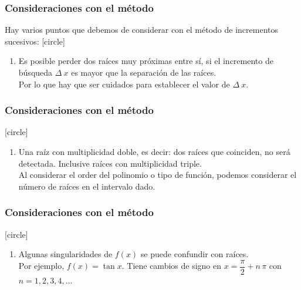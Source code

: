 \begin{frame}
\frametitle{Consideraciones con el método}
Hay varios puntos que debemos de considerar con el método de incrementos sucesivos:
[circle]
\begin{enumerate}[<+->]
\item Es posible perder dos raíces muy próximas entre sí, si el incremento de búsqueda $\Delta \: x$ es mayor que la separación de las raíces.
\\
\bigskip
Por lo que hay que ser cuidados para establecer el valor de $\Delta \: x$.
\seti
\end{enumerate}
\end{frame}
\begin{frame}
\frametitle{Consideraciones con el método}
[circle]
\begin{enumerate}[<+->]	
\conti
\item Una raíz con multiplicidad doble, es decir: dos raíces que coinciden, no será detectada. Inclusive raíces con multiplicidad triple.
\\
\bigskip
Al considerar el order del polinomio o tipo de función, podemos considerar el número de raíces en el intervalo dado.
\seti
\end{enumerate}
\end{frame}
\begin{frame}
\frametitle{Consideraciones con el método}
[circle]
\begin{enumerate}[<+->]	
\conti
\item Algunas singularidades de $f(x)$ se puede confundir con raíces. 
\\
\bigskip
Por ejemplo, $f(x) = \tan x$. Tiene cambios de signo en $x = \dfrac{\pi}{2} + n \, \pi$ con $n = 1, 2, 3, 4, \ldots$
\end{enumerate}
\end{frame}
